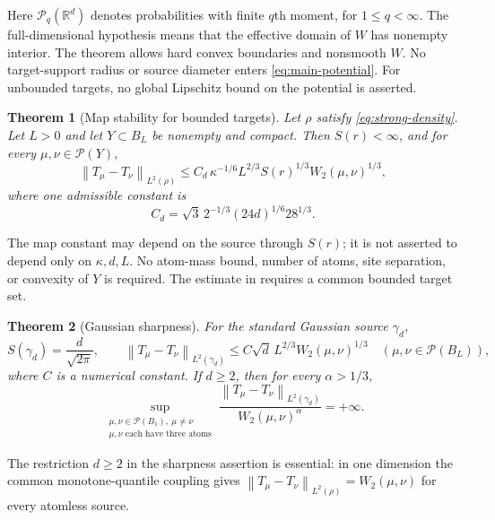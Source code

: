 \documentclass[11pt]{article}
\numberwithin{equation}{section}
\newtheorem{theorem}{Theorem}[section]
\theoremstyle{remark}
\newcommand{\R}{\mathbb R}
\newcommand{\Prob}{\mathcal P}
\newcommand{\norm}[1]{\left\lVert #1\right\rVert}
\begin{document}
Here $\Prob_q(\R^d)$ denotes probabilities with finite $q$th moment, for $1\le q<\infty$. The full-dimensional hypothesis means that the effective domain of $W$ has nonempty interior. The theorem allows hard convex boundaries and nonsmooth $W$. No target-support radius or source diameter enters \eqref{eq:main-potential}. For unbounded targets, no global Lipschitz bound on the potential is asserted.

\begin{theorem}[Map stability for bounded targets]\label{thm:maps}
Let $\rho$ satisfy \eqref{eq:strong-density}. Let $L>0$ and let $Y\subset B_L$ be nonempty and compact. Then $S(r)<\infty$, and for every $\mu,\nu\in\Prob(Y)$,
\begin{equation}\label{eq:main-map}
 \norm{T_\mu-T_\nu}_{L^2(\rho)}
 \le C_d\,\kappa^{-1/6}L^{2/3}S(r)^{1/3}
          W_2(\mu,\nu)^{1/3},
\end{equation}
where one admissible constant is
\begin{equation}\label{eq:main-constant}
 C_d=\sqrt3\,2^{-1/3}(24d)^{1/6}28^{1/3}.
\end{equation}
\end{theorem}

The map constant may depend on the source through $S(r)$; it is not asserted to depend only on $\kappa,d,L$. No atom-mass bound, number of atoms, site separation, or convexity of $Y$ is required. The estimate in  requires a common bounded target set.

\begin{theorem}[Gaussian sharpness]\label{thm:sharp}
For the standard Gaussian source $\gamma_d$,
\[
 S(\gamma_d)=\frac{d}{\sqrt{2\pi}},\qquad
 \norm{T_\mu-T_\nu}_{L^2(\gamma_d)}
 \le C\sqrt d\,L^{2/3}W_2(\mu,\nu)^{1/3}
 \quad(\mu,\nu\in\Prob(B_L)),
\]
where $C$ is a numerical constant. If $d\ge2$, then for every $\alpha>1/3$,
\begin{equation}\label{eq:sharp-claim}
 \sup_{\substack{\mu,\nu\in\Prob(B_1),\ \mu\ne\nu\\
                  \mu,\nu\text{ each have three atoms}}}
 \frac{\norm{T_\mu-T_\nu}_{L^2(\gamma_d)}}{W_2(\mu,\nu)^\alpha}
 =+\infty.
\end{equation}
\end{theorem}

The restriction $d\ge2$ in the sharpness assertion is essential: in one dimension the common monotone-quantile coupling gives $\norm{T_\mu-T_\nu}_{L^2(\rho)}=W_2(\mu,\nu)$ for every atomless source.
\end{document}
